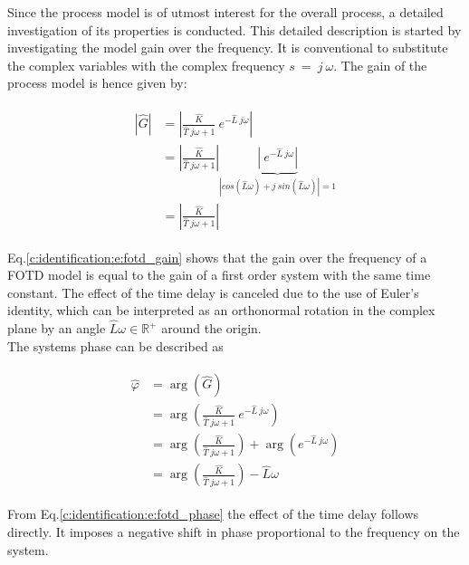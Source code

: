Since the process model is of utmost interest for the overall process, a detailed investigation of its properties is conducted. This detailed description is started by investigating the model gain over the frequency. It is conventional to substitute the complex variables with the complex frequency $s~=~j~\omega$. The gain of the process model is hence given by:

\begin{align}
\begin{split}
\left| \hat{G} \right| &= \left| \frac{\hat{K}}{\hat{T}~j\omega+1} ~ e^{-\hat{L}~j\omega} \right| \\
&= \left| \frac{\hat{K}}{\hat{T}~j\omega+1} \right| \underbrace{\left| ~ e^{-\hat{L}~j\omega} \right|}_{\left|cos(\hat{L}\omega)+j~sin(\hat{L}\omega)\right| = 1} \\
&= \left| \frac{\hat{K}}{\hat{T}~j\omega+1} \right|
\end{split}
\label{c:identification:e:fotd_gain}
\end{align}

Eq.\ref{c:identification:e:fotd_gain} shows that the gain over the frequency of a FOTD model is equal to the gain of a first order system with the same time constant. The effect of the time delay is canceled due to the use of Euler's identity, which can be interpreted as an orthonormal rotation in the complex plane by an angle $\hat{L}\omega \in \mathbb{R}^+$ around the origin.\\

The systems phase can be described as

\begin{align}
\begin{split}
\hat{\varphi} &= \arg\left( \hat{G} \right) \\
&= \arg\left(\frac{\hat{K}}{\hat{T}~j\omega+1} ~ e^{-\hat{L}~j\omega} \right) \\
&= \arg\left(\frac{\hat{K}}{\hat{T}~j\omega+1}\right) + \arg\left( e^{-\hat{L}~j\omega}\right) \\
&= \arg\left(\frac{\hat{K}}{\hat{T}~j\omega+1}\right) - \hat{L}\omega
\end{split}
\label{c:identification:e:fotd_phase}
\end{align}

From Eq.\ref{c:identification:e:fotd_phase} the effect of the time delay follows directly. It imposes a negative shift in phase proportional to the frequency on the system. \\

